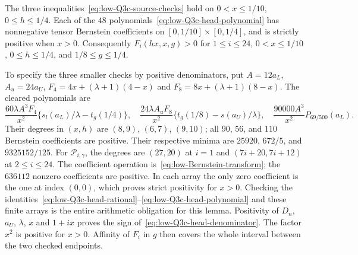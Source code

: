 \begin{lemma}
\label{lem:low-Q3c-arithmetic}
The three inequalities~\eqref{eq:low-Q3c-source-checks} hold on
$0<x\le1/10$, $0\le h\le1/4$.
Each of the $48$ polynomials~\eqref{eq:low-Q3c-head-polynomial}
has nonnegative tensor Bernstein coefficients on
$[0,1/10]\times[0,1/4]$, and is strictly positive when $x>0$.
Consequently $F_i(hx,x,g)>0$ for $1\le i\le24$,
$0<x\le1/10$, $0\le h\le1/4$, and $1/8\le g\le1/4$.
\end{lemma}

To specify the three smaller checks by positive denominators, put
$A=12a_L$, $A_u=24a_U$,
$F_4=4x+(\lambda+1)(4-x)$ and
$F_8=8x+(\lambda+1)(8-x)$.
The cleared polynomials are
\[
 \frac{60\lambda A^3F_4}{x^2}\{s_l(a_L)/\lambda-t_g(1/4)\},\quad
 \frac{24\lambda A_uF_8}{x^2}\{t_g(1/8)-s(a_U)/\lambda\},\quad
 \frac{90000A^3}{x^2}P_{69/500}(a_L).
\]
Their degrees in $(x,h)$ are $(8,9)$, $(6,7)$, $(9,10)$; all
$90$, $56$, and $110$ Bernstein coefficients are positive.  Their
respective minima are $25920$, $672/5$, and $9325152/125$.
For $\mathcal P_{i,\gamma}$, the degrees are $(27,20)$ at $i=1$ and
$(7i+20,7i+12)$ at $2\le i\le24$.
The coefficient operation is~\eqref{eq:low-Bernstein-transform};
the $636112$ nonzero coefficients are positive. In each array the
only zero coefficient is the one at index $(0,0)$, which proves
strict positivity for $x>0$. Checking the
identities~\eqref{eq:low-Q3c-head-rational}--\eqref{eq:low-Q3c-head-polynomial}
and these finite arrays is the entire arithmetic obligation for this
lemma.  Positivity of $D_n$, $a_U$, $\lambda$, $x$ and $1+ix$
proves the sign of~\eqref{eq:low-Q3c-head-denominator}. The factor
$x^2$ is positive for $x>0$. Affinity of $F_i$ in $g$
then covers the whole interval between the two checked endpoints.

